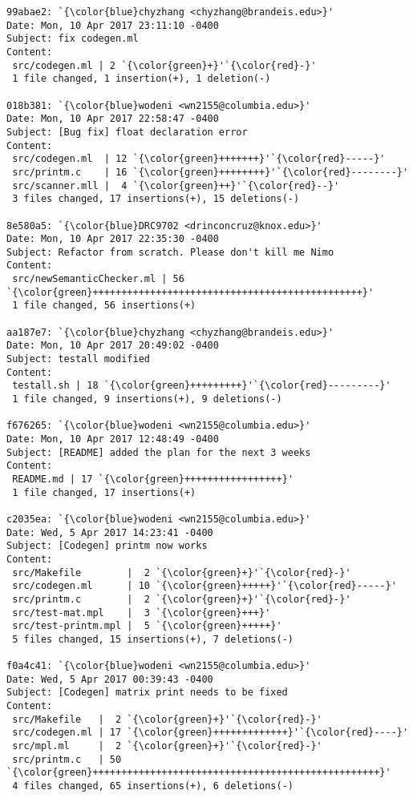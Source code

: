 \begin{lstlisting}
99abae2: `{\color{blue}chyzhang <chyzhang@brandeis.edu>}'
Date: Mon, 10 Apr 2017 23:11:10 -0400
Subject: fix codegen.ml
Content: 
 src/codegen.ml | 2 `{\color{green}+}'`{\color{red}-}'
 1 file changed, 1 insertion(+), 1 deletion(-)

018b381: `{\color{blue}wodeni <wn2155@columbia.edu>}'
Date: Mon, 10 Apr 2017 22:58:47 -0400
Subject: [Bug fix] float declaration error
Content: 
 src/codegen.ml  | 12 `{\color{green}+++++++}'`{\color{red}-----}'
 src/printm.c    | 16 `{\color{green}++++++++}'`{\color{red}--------}'
 src/scanner.mll |  4 `{\color{green}++}'`{\color{red}--}'
 3 files changed, 17 insertions(+), 15 deletions(-)

8e580a5: `{\color{blue}DRC9702 <drinconcruz@knox.edu>}'
Date: Mon, 10 Apr 2017 22:35:30 -0400
Subject: Refactor from scratch. Please don't kill me Nimo
Content: 
 src/newSemanticChecker.ml | 56 `{\color{green}+++++++++++++++++++++++++++++++++++++++++++++++}'
 1 file changed, 56 insertions(+)

aa187e7: `{\color{blue}chyzhang <chyzhang@brandeis.edu>}'
Date: Mon, 10 Apr 2017 20:49:02 -0400
Subject: testall modified
Content: 
 testall.sh | 18 `{\color{green}+++++++++}'`{\color{red}---------}'
 1 file changed, 9 insertions(+), 9 deletions(-)

f676265: `{\color{blue}wodeni <wn2155@columbia.edu>}'
Date: Mon, 10 Apr 2017 12:48:49 -0400
Subject: [README] added the plan for the next 3 weeks
Content: 
 README.md | 17 `{\color{green}+++++++++++++++++}'
 1 file changed, 17 insertions(+)

c2035ea: `{\color{blue}wodeni <wn2155@columbia.edu>}'
Date: Wed, 5 Apr 2017 14:23:41 -0400
Subject: [Codegen] printm now works
Content: 
 src/Makefile        |  2 `{\color{green}+}'`{\color{red}-}'
 src/codegen.ml      | 10 `{\color{green}+++++}'`{\color{red}-----}'
 src/printm.c        |  2 `{\color{green}+}'`{\color{red}-}'
 src/test-mat.mpl    |  3 `{\color{green}+++}'
 src/test-printm.mpl |  5 `{\color{green}+++++}'
 5 files changed, 15 insertions(+), 7 deletions(-)

f0a4c41: `{\color{blue}wodeni <wn2155@columbia.edu>}'
Date: Wed, 5 Apr 2017 00:39:43 -0400
Subject: [Codegen] matrix print needs to be fixed
Content: 
 src/Makefile   |  2 `{\color{green}+}'`{\color{red}-}'
 src/codegen.ml | 17 `{\color{green}+++++++++++++}'`{\color{red}----}'
 src/mpl.ml     |  2 `{\color{green}+}'`{\color{red}-}'
 src/printm.c   | 50 `{\color{green}++++++++++++++++++++++++++++++++++++++++++++++++++}'
 4 files changed, 65 insertions(+), 6 deletions(-)


\end{lstlisting}
